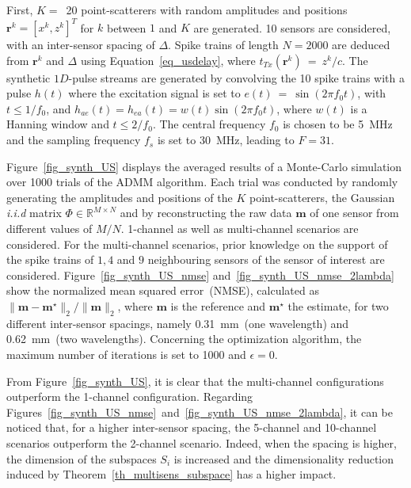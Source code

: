 \documentclass{article}
\newcommand{\vect}[1]{\bm{#1}}
\newcommand{\mat}[1]{\mathsf{#1}}
\theoremstyle{definition}
\begin{document}
First, $K=$~\num{20} point-scatterers with random amplitudes and positions $\vect{r}^k = \left[x^k, z^k\right]^T$ for $k$ between $1$ and $K$ are generated. \num{10} sensors are considered, with an inter-sensor spacing of $\Delta$. Spike trains of length $N = 2000$ are deduced from $\vect{r}^k$ and $\Delta$ using Equation~\eqref{eq_usdelay}, where $t_{Tx}\left(\vect{r}^k\right)~=~z^k /c$.
The synthetic $1D$-pulse streams are generated by convolving the \num{10} spike trains with a pulse $h\left(t\right)$ where the excitation signal is set to $e\left(t\right)~=~\sin \left(2 \pi f_0 t\right)$, with $t \leq 1/f_0$, and $h_{ae} \left(t\right) = h_{ea} \left(t\right) = w\left(t\right) \sin \left(2 \pi f_0 t\right)$, where $w\left(t\right)$ is a Hanning window and $t\leq2/f_0$. The central frequency $f_0$ is chosen to be \SI{5}{\mega\hertz} and the sampling frequency $f_s$ is set to \SI{30}{\mega\hertz}, leading to $F=31$.

Figure~\ref{fig_synth_US} displays the averaged results of a Monte-Carlo simulation over \num{1000} trials of the ADMM algorithm. Each trial was conducted by randomly generating the amplitudes and positions of the $K$ point-scatterers, the Gaussian \textit{i.i.d} matrix $\mat{\Phi} \in \mathbb{R}^{M \times N}$ and by reconstructing the raw data $\vect{m}$ of one sensor from different values of $M/N$. 1-channel as well as multi-channel scenarios are considered. For the multi-channel scenarios, prior knowledge on the support of the spike trains of $1, 4$ and $9$ neighbouring sensors of the sensor of interest are considered. Figure~\ref{fig_synth_US_nmse} and~\ref{fig_synth_US_nmse_2lambda} show the normalized mean squared error~(NMSE), calculated as $\| \vect{m} - \vect{m}^\star \|_2 / \| \vect{m}\|_2$, where $\vect{m}$ is the reference and $\vect{m}^\star$ the estimate, for two different inter-sensor spacings, namely \SI{0.31}{\milli\metre}~(one wavelength) and \SI{0.62}{\milli\metre}~(two wavelengths). Concerning the optimization algorithm, the maximum number of iterations is set to \num{1000} and $\epsilon = 0$. 

From Figure~\ref{fig_synth_US}, it is clear that the multi-channel configurations outperform the 1-channel configuration. Regarding Figures~\ref{fig_synth_US_nmse}~and~\ref{fig_synth_US_nmse_2lambda}, it can be noticed that, for a higher inter-sensor spacing, the \num{5}-channel and \num{10}-channel scenarios outperform the \num{2}-channel scenario. Indeed, when the spacing is higher, the dimension of the subspaces $S_i$ is increased and the dimensionality reduction induced by Theorem~\ref{th_multisens_subspace} has a higher impact.
\end{document}
